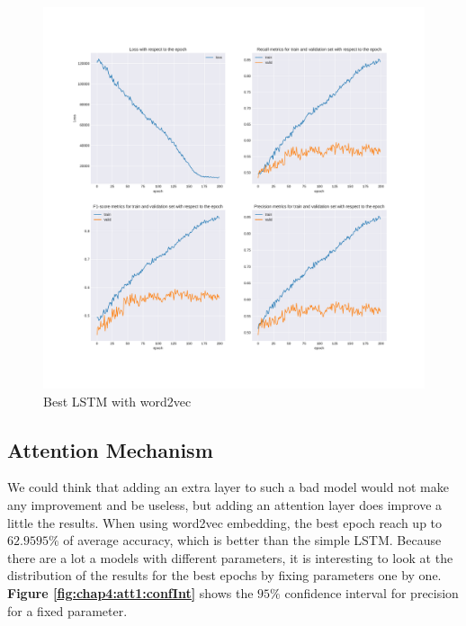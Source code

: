 \begin{figure}
	\centering
	\includegraphics[width=\textwidth]{images/chapitre4/lstm1}
	\caption{Best LSTM with word2vec}
	\label{fig:chap4:lstm1}
\end{figure}


\subsection{Attention Mechanism}
We could think that adding an extra layer to such a bad model would not make any improvement and be useless, but adding an attention layer does improve a little the results. When using word2vec embedding, the best epoch reach up to $62.9595\%$ of average accuracy, which is better than the simple LSTM. Because there are a lot a models with different parameters, it is interesting to look at the distribution of the results for the best epochs by fixing parameters one by one. \textbf{Figure \ref{fig:chap4:att1:confInt}} shows the $95\%$ confidence interval for precision for a fixed parameter. \\

